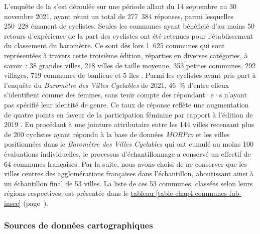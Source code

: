 \begin{refsegment}
L'enquête de la \textcolor{blue}{\textcite{fub_barometre_2021}} s'est déroulée sur une période allant du 14 septembre au 30 novembre 2021, ayant réuni un total de 277~384 réponses, parmi lesquelles 250~228 émanent de cyclistes. Seules les communes ayant bénéficié d'au moins 50 retours d'expérience de la part des cyclistes ont été retenues pour l'établissement du classement du baromètre. Ce sont dès lors 1~625 communes qui sont représentées à travers cette troisième édition, réparties en diverses catégories, à savoir~: 38 grandes villes, 218 villes de taille moyenne, 353 petites communes, 292 villages, 719 communes de banlieue et 5 îles \textcolor{blue}{\autocite[7]{vermeulen_barometre_2022}}. Parmi les cyclistes ayant pris part à l'enquête du \textsl{Baromètre des Villes Cyclables} de 2021, 46~\% d'entre elleux s'identifient comme des femmes, sans tenir compte des répondant·e·s n'ayant pas spécifié leur identité de genre. Ce taux de réponse reflète une augmentation de quatre points en faveur de la participation féminine par rapport à l'édition de 2019 \textcolor{blue}{\autocite[10]{vermeulen_barometre_2022}}. En procédant à une jointure attributaire entre les 144 villes recensant plus de 200 cyclistes ayant répondu à la base de données \textsl{MOBPro} et les villes positionnées dans le \textsl{Baromètre des Villes Cyclables} qui ont cumulé au moins 100 évaluations individuelles, le processus d'échantillonnage a conservé un effectif de 64 communes françaises. Par la suite, nous avons choisi de ne conserver que les villes centres des agglomérations françaises dans l'échantillon, aboutissant ainsi à un échantillon final de 53 villes. La liste de ces 53 communes, classées selon leurs régions respectives, est présentée dans le \hyperref[table-chap4:communes-fub-insee]{tableau \ref{table-chap4:communes-fub-insee}} (page~\pageref{table-chap4:communes-fub-insee}).%

\subsubsection*{Sources de données cartographiques
    \label{chap4:source-cartographique}
    }


\end{refsegment}
